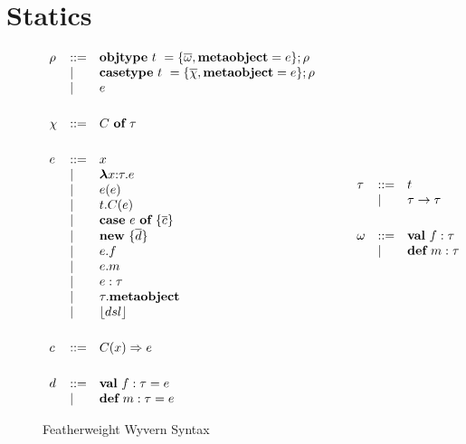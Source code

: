 \section{Statics}

\begin{figure}
\centering
\[
\begin{array}{lll}
\rho & \bnfdef & \keyw{objtype}~ t~ = \{ \overline{\omega}, \keyw{metaobject}=e \}; \rho \\
     & \bnfalt & \keyw{casetype}~ t~ = \{ \overline{\chi}, \keyw{metaobject}=e \}; \rho\\
     & \bnfalt & e\\
     \\[1ex]
\chi & \bnfdef & C~\keyw{of}~\tau\\
\\[1ex]
e    & \bnfdef & x \\
     & \bnfalt & \boldsymbol\lambda x{:}\tau . e \\ %
     & \bnfalt & e(e) \\
     & \bnfalt & t.C(e) \\
     & \bnfalt & \keyw{case}~e~\keyw{of}~\{ \overline{c} \} \\
     & \bnfalt & \keyw{new}~ \{ \overline{d} \}\\
     & \bnfalt & e.f \\
     & \bnfalt & e.m \\
     & \bnfalt & e : \tau\\
     & \bnfalt & \tau.\keyw{metaobject}\\
     & \bnfalt & \lfloor dsl \rfloor \\
\\[1ex]
c    & \bnfdef & C(x) \Rightarrow e\\
	 \\[1ex]
d    & \bnfdef & \keyw{val}~ f:\tau = e \\
     & \bnfalt & \keyw{def}~ m:\tau = e 
\end{array}
\begin{array}{lll}
~~~~
\end{array}
\begin{array}{lll}
\tau & \bnfdef & t\\
     & \bnfalt & \tau \rightarrow \tau \\
\\[1ex]

\omega   & \bnfdef & \keyw{val}~ f:\tau\\
         & \bnfalt & \keyw{def}~ m:\tau \\
\\[1ex]
\end{array}
\]
\caption{Featherweight Wyvern Syntax}
\label{fig:core2-syntax}
\end{figure}



